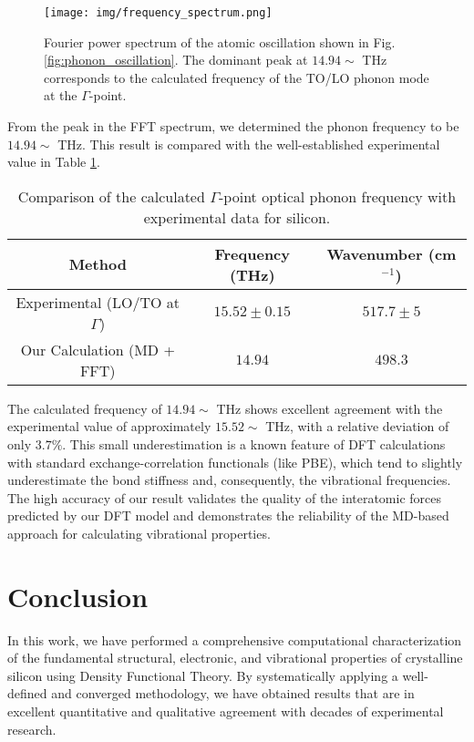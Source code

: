 \documentclass{article}
\begin{document}
\begin{figure}[h!]
    \centering
    \texttt{[image: img/frequency\_spectrum.png]} %
    \caption{Fourier power spectrum of the atomic oscillation shown in Fig. \ref{fig:phonon_oscillation}. The dominant peak at $14.94\sim$ THz corresponds to the calculated frequency of the TO/LO phonon mode at the $\Gamma$-point.}
    \label{fig:phonon_fft}
\end{figure}

From the peak in the FFT spectrum, we determined the phonon frequency to be $14.94\sim$ THz. This result is compared with the well-established experimental value in Table \ref{tab:phonon_comparison}.

\begin{table}[h!]
    \centering
    \caption{Comparison of the calculated $\Gamma$-point optical phonon frequency with experimental data for silicon.}
    \label{tab:phonon_comparison} %
    \begin{tabular}{c c c}
        \hline\hline
         \textbf{Method} & \textbf{Frequency (THz)} & \textbf{Wavenumber (cm$^{-1}$)} \\
         \hline
         Experimental (LO/TO at $\Gamma$) & $15.52 \pm 0.15$ \cite{dolling_1963} & $517.7 \pm 5$ \cite{temple_1971} \\
         Our Calculation (MD + FFT) & $14.94$ & $498.3$ \\
         \hline\hline
    \end{tabular}
\end{table}

The calculated frequency of $14.94\sim$ THz shows excellent agreement with the experimental value of approximately $15.52\sim$ THz, with a relative deviation of only $3.7\%$. This small underestimation is a known feature of DFT calculations with standard exchange-correlation functionals (like PBE), which tend to slightly underestimate the bond stiffness and, consequently, the vibrational frequencies. The high accuracy of our result validates the quality of the interatomic forces predicted by our DFT model and demonstrates the reliability of the MD-based approach for calculating vibrational properties.


\section{Conclusion}

In this work, we have performed a comprehensive computational characterization of the fundamental structural, electronic, and vibrational properties of crystalline silicon using Density Functional Theory. By systematically applying a well-defined and converged methodology, we have obtained results that are in excellent quantitative and qualitative agreement with decades of experimental research.
\end{document}
